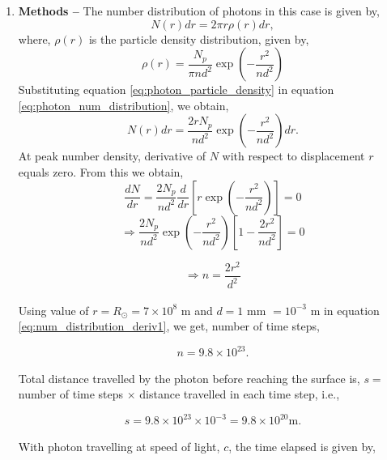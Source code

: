 \documentclass[a4paper]{article}
\begin{document}
\begin{enumerate} [label*=\textbf{(\alph*)}]
			\item
				\subitem \textbf{Methods --}
					The number distribution of photons in this case is given by,
					\begin{equation}
						N(r) dr = 2 \pi r \rho (r) dr,
						\label{eq:photon_num_distribution}
					\end{equation}
					where, \(\rho (r)\) is the particle density distribution, given by,
					\begin{equation}
						\rho (r) = \frac{N_p^{}}{\pi n d^2_{}} \exp \left( - \frac{r^2_{}}{nd^2_{}} \right)
						\label{eq:photon_particle_density} 
					\end{equation}
					Substituting equation \ref{eq:photon_particle_density} in equation \ref{eq:photon_num_distribution}, we obtain,
					\[N(r)dr = \frac{2rN_p^{}}{nd^2_{}} \exp \left( - \frac{r^2_{}}{nd^2_{}} \right) dr.\]
					At peak number density, derivative of \(N\) with respect to displacement \(r\) equals zero. From this we obtain,
					\[\frac{dN}{dr} = \frac{2N_p^{}}{nd^2_{}} \frac{d}{dr} \left[ r \exp \left( - \frac{r^2_{}}{nd^2_{}} \right) \right] = 0 \]
					\[\Rightarrow \frac{2N_p}{nd^2_{}} \exp \left( - \frac{r^2_{}}{nd^2_{}} \right) \left[ 1- \frac{2r^2_{}}{nd^2_{}} \right] = 0 \]
					
					\begin{equation}
						\Rightarrow n = \frac{2r^2_{}}{d^2_{}}
						\label{eq:num_distribution_deriv1}
					\end{equation}
					
					Using value of \(r = R_\odot^{} = 7 \times 10^8_{}\) m and \(d=1\) mm \(=10^{-3}_{}\) m in equation \ref{eq:num_distribution_deriv1}, we get, number of time steps,
					
					\begin{equation}
						n = 9.8 \times 10^{23}_{}.
						\label{eq:num_distribution_value}
					\end{equation}
					
					Total distance travelled by the photon before reaching the surface is, \(s = \) number of time steps \(\times\) distance travelled in each time step, i.e.,
					
					\begin{equation}
						s = 9.8\times 10^{23}_{} \times 10^{-3} = 9.8 \times 10^{20} \text{m}.
					\end{equation}
					
					With photon travelling at speed of light, \(c\), the time elapsed is given by,
					

\end{enumerate}
\end{document}
